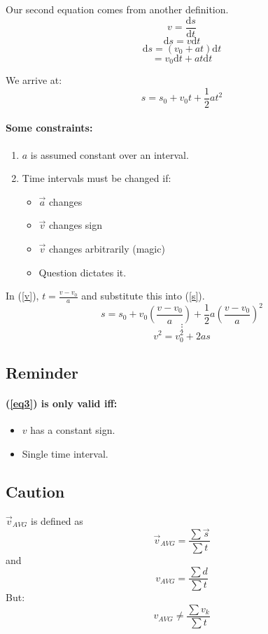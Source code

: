 \documentclass[letterpaper]{article}
\begin{document}
Our second equation comes from another definition.
\[
    v = \frac{\text{d}s}{\text{d}t}
\]
\[
    \text{d}s = v\text{d}t
\]
\[
    \text{d}s = (v_0 + at)\text{d}t
\]
\[
    = v_0\text{d}t + at\text{d}t
\]

We arrive at:
\begin{equation} \label{s}
    s = s_0 + v_0 t + \frac{1}{2}at^2
\end{equation}
\paragraph*{Some constraints:}
\begin{enumerate}
    \item $a$ is assumed constant over an interval.
    \item Time intervals must be changed if:
    \begin{itemize}
        \item $\vec{a}$ changes
        \item $\vec{v}$ changes sign
        \item $\vec{v}$ changes arbitrarily (magic)
        \item Question dictates it.
    \end{itemize}
\end{enumerate}
\newpage
In (\ref{v}), $t = \frac{v - v_0}{a}$ and substitute this into (\ref{s}).
\[
    s = s_0 + v_0 \left(\frac{v - v_0}{a}\right) + 
    \frac{1}{2} a \left( \frac{v - v_0}{a}\right) ^ 2
\]
\[
    \vdots
\]
\begin{equation} \label{eq3}
    v^2 = v_0^2 + 2as
\end{equation}
\subsection{Reminder}
\paragraph*{(\ref{eq3}) is only valid iff:}
    \begin{itemize}
        \item $v$ has a constant sign.
        \item Single time interval.
    \end{itemize}
\subsection{Caution}
$\vec{v}_{AVG}$ is defined as 
\[
\vec{v}_{AVG} = \frac{\sum{\vec{s}}}{\sum{t}}
\]
and
\[
    v_{AVG} = \frac{\sum{d}}{\sum{t}}
\]
But:
\[
    v_{AVG} \neq \frac{\sum{v_k}}{\sum{t}}
\]
\end{document}

